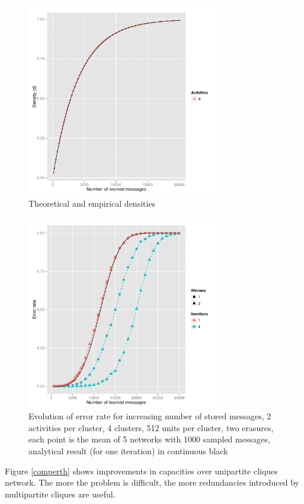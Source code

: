 \documentclass[english,11pt,twocolumn]{article}
\theoremstyle{definition}
\begin{document}
		
	\begin{figure}[!htb]
		\includegraphics[width=8.5cm]{Courbes/remplacement_densite_c8l256a4}
		\caption{Theoretical and empirical densities}
			\label{densiteth}
	\end{figure}
	
	
	\begin{figure}[!htb]
		\includegraphics[width=8.5cm]{Courbes/remplacement_figure2g1} %
		\caption{Evolution of error rate for increasing number of stored messages, 2 activities per cluster, 4 clusters, 512 units per cluster, two erasures, each point is the mean of 5 networks with 1000 sampled messages, analytical result (for one iteration) in continuous black}
			\label{erasuresth}
		\end{figure}
		
		Figure \ref{comperth} shows improvements in capacities over unipartite cliques network. The more the problem is difficult, the more redundancies introduced by multipartite cliques are useful.
		
\end{document}
